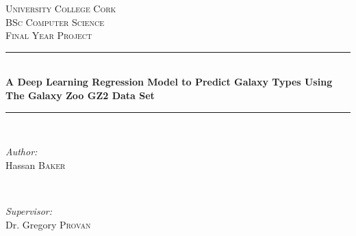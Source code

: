 \documentclass[12pt,a4paper,oneside,oldfontcommands]{memoir}
\begin{document}
%
%
\thispagestyle{empty}

\begin{page}

\newcommand{\HRule}{\rule{\linewidth}{0.5mm}} %

\center %
 

\textsc{\LARGE University College Cork}\\[1.5cm] %
\textsc{\Large BSc Computer Science}\\[0.5cm] %
\textsc{\large Final Year Project}\\[0.5cm] %


\HRule \\[0.4cm]
{ \huge \bfseries A Deep Learning Regression Model to Predict Galaxy Types Using The Galaxy Zoo GZ2 Data Set
}\\[0.4cm] %
\HRule \\[1cm]
 

\begin{minipage}{0.4\textwidth}
\begin{flushleft} \large
\emph{Author:}\\
Hassan \textsc{Baker} %
\end{flushleft}
\end{minipage}
~
\begin{minipage}{0.4\textwidth}
\begin{flushright} \large
\emph{Supervisor:} \\
Dr. Gregory \textsc{Provan} %
\end{flushright}
\end{minipage}\\[1cm]


\end{page}
\end{document}
